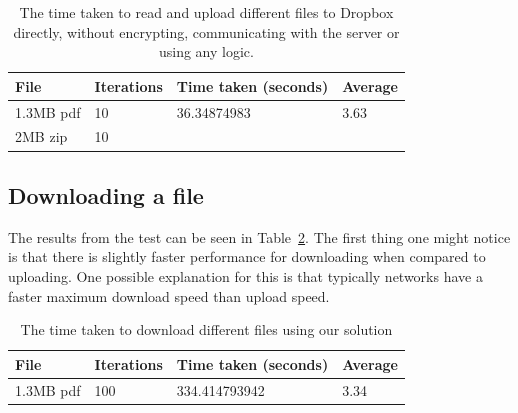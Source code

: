 \documentclass[12pt, titlepage]{article}
\begin{document}
\bigskip
\begin{table}[h!]
\begin{center}
    \begin{tabular}{ | l | l | l | l |}
    \hline
    \textbf{File} & \textbf{Iterations} & \textbf{Time taken (seconds)} & \textbf{Average} \\ \hline
    
    1.3MB pdf & 10 & 36.34874983 & 3.63 \\ \hline
    2MB zip & 10 & & \\ \hline
    
    \end{tabular}
    \caption{The time taken to read and upload different files to Dropbox directly, without encrypting, communicating with the server or using any logic.} \label{tab:uploadDropboxBenchmark}
    \end{center}
\end{table}



\subsection{Downloading a file}
The results from the test can be seen in Table~\ref{tab:downloadBenchmark}. The first thing one might notice is that there is slightly faster performance for downloading when compared to uploading. One possible explanation for this is that typically networks have a faster maximum download speed than upload speed.

\bigskip
\begin{table}[h]
\begin{center}
    \begin{tabular}{ | l | l | l | l |}
    \hline
    \textbf{File} & \textbf{Iterations} & \textbf{Time taken (seconds)} & \textbf{Average} \\ \hline
    
    1.3MB pdf  & 100 &  334.414793942 & 3.34 \\ \hline
    
    \end{tabular}
    \caption{The time taken to download different files using our solution} \label{tab:downloadBenchmark}
    \end{center}
    \end{table}
\bigskip
\end{document}
